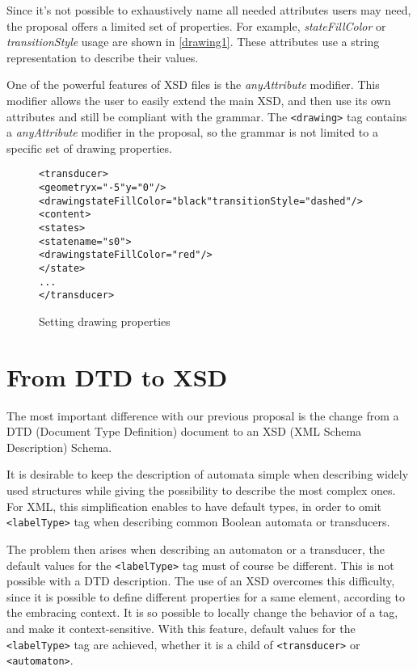 \documentclass[a4paper]{article}
\newcommand{\xtag}[1]{\texttt{<#1>}}
\def\typetag{\xtag{labelType}}
\def\drawingtag{\xtag{drawing}}
\def\automatontag{\xtag{automaton}}
\def\transducertag{\xtag{transducer}}
\begin{document}
Since it's not possible to exhaustively name all needed attributes
users may need, the proposal offers a limited set of properties. For
example, \textit{stateFillColor} or \textit{transitionStyle} usage are
shown in \autoref{drawing1}. These attributes use a string
representation to describe their values.

One of the powerful features of XSD files is the \textit{anyAttribute}
modifier. This modifier allows the user to easily extend the main XSD,
and then use its own attributes and still be compliant with the
grammar. The \drawingtag{} tag contains a \textit{anyAttribute}
modifier in the proposal, so the grammar is not limited to a specific
set of drawing properties.

\begin{figure}[ht]
  \small
  \begin{center}
\begin{alltt}
<transducer>
  <geometry x="-5" y="0"/>
  <drawing stateFillColor="black" transitionStyle="dashed"/>
  <content>
     <states>
        <state name="s0">
            <drawing stateFillColor="red"/>
        </state>
      ...
</transducer>
\end{alltt}

\caption{Setting drawing properties}
\label{drawing1}
  \end{center}
\end{figure}


\section{From DTD to XSD}
The most important difference with our previous proposal
\cite{VXML04} is the change from a DTD (Document Type Definition)
document to an XSD (XML Schema Description) Schema.

It is desirable to keep the description of automata simple when
describing widely used structures while giving the possibility to
describe the most complex ones. For XML, this simplification enables
to have default types, in order to omit \typetag{} tag when describing
common Boolean automata or transducers.

The problem then arises when describing an automaton or a transducer,
the default values for the \typetag{} tag must of course be different.
This is not possible with a DTD description.  The use of an XSD
overcomes this difficulty, since it is possible to define different
properties for a same element, according to the embracing context. It
is so possible to locally change the behavior of a tag, and make it
context-sensitive. With this feature, default values for the
\typetag{} tag are achieved, whether it is a child of
\transducertag{} or \automatontag{}.
\end{document}
